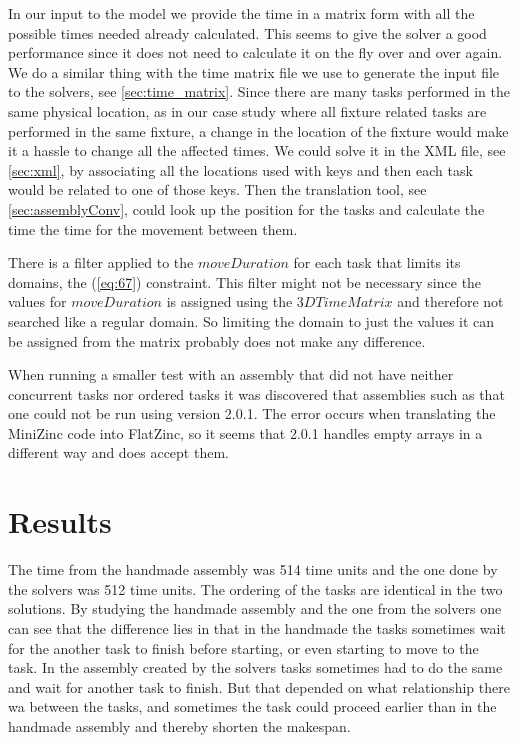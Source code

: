 In our input to the model we provide the time in a matrix form with all the possible times needed already calculated. This seems to give the solver a good performance since it does not need to calculate it on the fly over and over again. We do a similar thing with the time matrix file we use to generate the input file to the solvers, see \ref{sec:time_matrix}. Since there are many tasks performed in the same physical location, as in our case study where all fixture related tasks are performed in the same fixture, a change in the location of the fixture would make it a hassle to change all the affected times. We could solve it in the XML file, see \ref{sec:xml}, by associating all the locations used with keys and then each task would be related to one of those keys. Then the translation tool, see \ref{sec:assemblyConv}, could look up the position for the tasks and calculate the time the time for the movement between them.

There is a filter applied to the $moveDuration$ for each task that limits its domains, the (\ref{eq:67}) constraint. This filter might not be necessary since the values for $moveDuration$ is assigned using the $3DTimeMatrix$ and therefore not searched like a regular domain. So limiting the domain to just the values it can be assigned from the matrix probably does not make any difference.

When running a smaller test with an assembly that did not have neither concurrent tasks nor ordered tasks it was discovered that assemblies such as that one could not be run using version 2.0.1. The error occurs when translating the MiniZinc code into FlatZinc, so it seems that 2.0.1 handles empty arrays in a different way and does accept them.

\section{Results}
The time from the handmade assembly was 514 time units and the one done by the solvers was 512 time units. The ordering of the tasks are identical in the two solutions. By studying the handmade assembly and the one from the solvers one can see that the difference lies in that in the handmade the tasks sometimes wait for the another task to finish before starting, or even starting to move to the task. In the assembly created by the solvers tasks sometimes had to do the same and wait for another task to finish. But that depended on what relationship there wa between the tasks, and sometimes the task could proceed earlier than in the handmade assembly and thereby shorten the makespan.

